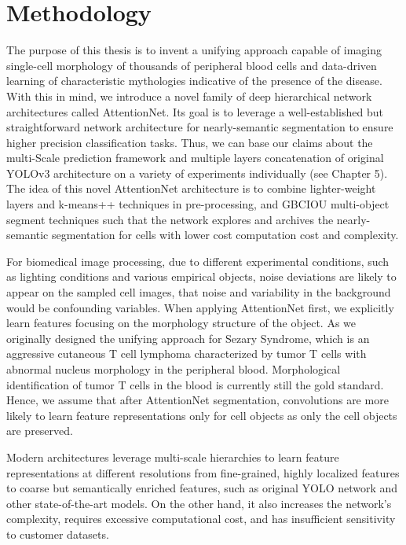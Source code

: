 \chapter{Methodology}
\label{sec:Methodology}
The purpose of this thesis is to invent a unifying approach capable of imaging single-cell morphology of thousands of peripheral blood cells and data-driven learning of characteristic mythologies indicative of the presence of the disease. With this in mind, we introduce a novel family of deep hierarchical network architectures called AttentionNet. Its goal is to leverage a well-established but straightforward network architecture for nearly-semantic segmentation to ensure higher precision classification tasks. Thus, we can base our claims about the multi-Scale prediction framework and multiple layers concatenation of original YOLOv3 architecture on a variety of experiments individually (see Chapter 5). The idea of this novel AttentionNet architecture is to combine lighter-weight layers and k-means++ techniques in pre-processing, and GBCIOU multi-object segment techniques such that the network explores and archives the nearly-semantic segmentation for cells with lower cost computation cost and complexity.

For biomedical image processing, due to different experimental conditions, such as lighting conditions and various empirical objects, noise deviations are likely to appear on the sampled cell images\cite{6}\cite{7}, that noise and variability in the background would be confounding variables.
When applying AttentionNet first, we explicitly learn features focusing on the morphology structure of the object. As we originally designed the unifying approach for Sezary Syndrome, which is an aggressive cutaneous T cell lymphoma characterized by tumor T cells with abnormal nucleus morphology in the peripheral blood. Morphological identification of tumor T cells in the blood is currently still the gold standard.
Hence, we assume that after AttentionNet segmentation, convolutions are more likely to learn feature representations only for cell objects as only the cell objects are preserved.

Modern architectures leverage multi-scale hierarchies to learn feature representations at different resolutions from fine-grained, highly localized features to coarse but semantically enriched features, such as original YOLO network and other state-of-the-art models. On the other hand, it also increases the network's complexity, requires excessive computational cost, and has insufficient sensitivity to customer datasets.

